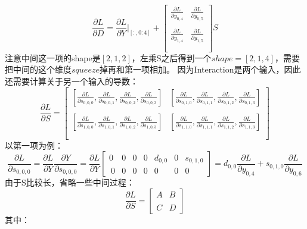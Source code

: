 \documentclass{article}
\begin{document}
$$
\frac{\partial L}{\partial D} = \frac{\partial L}{\partial Y}|_{[:,0:4]}+
\begin{bmatrix}
    \frac{\partial L}{\partial y_{0,4}} & \frac{\partial L}{\partial y_{0,5}} \\\\
    \frac{\partial L}{\partial y_{1,4}} & \frac{\partial L}{\partial y_{1,5}} \\\\
\end{bmatrix}
S
$$
注意中间这一项的shape是$[2,1,2]$，左乘S之后得到一个$shape=[2,1,4]$，需要把中间的这个维度$squeeze$掉再和第一项相加。
因为Interaction是两个输入，因此还需要计算关于另一个输入的导数：
$$
\frac{\partial L}{\partial S} = 
\begin{bmatrix}
    [\frac{\partial L}{\partial s_{0,0,0}},\frac{\partial L}{\partial s_{0,0,1}},\frac{\partial L}{\partial s_{0,0,2}},\frac{\partial L}{\partial s_{0,0,3}}] & [\frac{\partial L}{\partial s_{0,1,0}},\frac{\partial L}{\partial s_{0,1,1}},\frac{\partial L}{\partial s_{0,1,2}},\frac{\partial L}{\partial s_{0,1,3}}] \\\\
    [\frac{\partial L}{\partial s_{1,0,0}},\frac{\partial L}{\partial s_{1,0,1}},\frac{\partial L}{\partial s_{1,0,2}},\frac{\partial L}{\partial s_{1,0,3}}] & [\frac{\partial L}{\partial s_{1,1,0}},\frac{\partial L}{\partial s_{1,1,1}},\frac{\partial L}{\partial s_{1,1,2}},\frac{\partial L}{\partial s_{1,1,3}}] \\\\
\end{bmatrix}  
$$
以第一项为例：
$$
\frac{\partial L}{\partial s_{0,0,0}} = \frac{\partial L}{\partial Y}\frac{\partial Y}{\partial s_{0,0,0}}
=
\frac{\partial L}{\partial Y}
\begin{bmatrix}
    0 & 0 & 0 & 0 & d_{0,0} & 0 & s_{0,1,0} \\\
    0 & 0 & 0 & 0 &       0 & 0 &         0 
\end{bmatrix}
=d_{0,0} \frac{\partial L}{\partial y_{0,4}} +  s_{0,1,0}\frac{\partial L}{\partial y_{0,6}}
$$
由于S比较长，省略一些中间过程：
$$
\frac{\partial L}{\partial S} = 
\begin{bmatrix}
    A & B \\\\
    C & D 
\end{bmatrix}
$$
其中：
\end{document}

